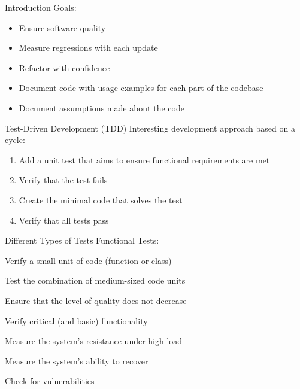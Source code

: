 \begin{frame}{Introduction}
  Goals:
  \begin{itemize}[<+->]
  \item Ensure software quality
  \item Measure regressions with each update
  \item Refactor with confidence
  \item Document code with usage examples for each part of the codebase
  \item Document assumptions made about the code
  \end{itemize}
  \end{frame}
  
  \begin{frame}{Test-Driven Development (TDD)}
  Interesting development approach based on a cycle:
  
  \begin{enumerate}[<+->]
  \item Add a unit test that aims to ensure functional requirements are met
  \item Verify that the test fails
  \item Create the minimal code that solves the test
  \item Verify that all tests pass
  \end{enumerate}
  \end{frame}
  
  \begin{frame}{Different Types of Tests}
  Functional Tests:
  
  \begin{description}[<+->]
  \item[Unit] Verify a small unit of code (function or class)
  \item[Integration] Test the combination of medium-sized code units
  \item[Regression] Ensure that the level of quality does not decrease
  \item[Smoke] Verify critical (and basic) functionality
  \end{description}
  
  
  \begin{description}[<+->]
  \item[Stress] Measure the system's resistance under high load
  \item[Recovery] Measure the system's ability to recover
  \item[Security] Check for vulnerabilities
  \item[…]
  \end{description}
  \end{frame}
  
